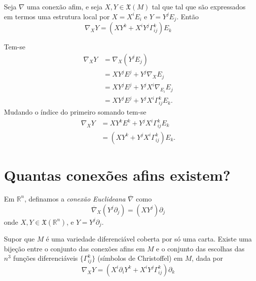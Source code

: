 \begin{lema}\label{conexiones lineales en función de símbolos de Chritoffel}
	Seja $\nabla$ uma conexão afim, e seja $X,Y \in \mathfrak{X}(M)$ tal que tal que são expressados em termos uma estrutura local por $X = X^i E_i$ e $Y = Y^j E_j$. Então
	\begin{equation*}
		\nabla_X Y = \left( X Y^k + X^i Y^j \Gamma^k_{ij} \right) E_k
	\end{equation*}
\end{lema}

\begin{demonstracao}
	Tem-se
	\begin{align*}
		\nabla_X Y &= \nabla_X (Y^j E_j)\\
		&= X Y^j E^j + Y^j \nabla_X E_j\\
		&= X Y^j E^j + Y^j X^i \nabla_{E_i} E_j\\
		&= X Y^j E^j + Y^j X^i \Gamma^k_{ij} E_k.
	\end{align*}
	Mudando o índice do primeiro somando tem-se
	\begin{align*}
		\nabla_X Y &= X Y^k E^k + Y^j X^i \Gamma^k_{ij} E_k\\
		&= (X Y^k + Y^j X^i \Gamma^k_{ij}) E_k.
	\end{align*}
\end{demonstracao}

\section{Quantas conexões afins existem?}

\begin{definicao}
	Em $\mathbb{R}^n$, definamos a \emph{conexão Euclideana} $\overline{\nabla}$ como
	\begin{equation*}
		\overline{\nabla}_X \left( Y^j \partial_j \right) = (X Y^j) \partial_j
	\end{equation*}
	onde $X,Y \in \mathfrak{X}(\mathbb{R}^n)$, e $Y = Y^j \partial_j$.
\end{definicao}

\begin{lema}\label{bijecao-entre-a-escolha-dos-simbolos-de-christoffel-e-as-conexoes-lineares}
	Supor que $M$ é uma variedade diferenciável coberta por só uma carta. Existe uma bijeção entre o conjunto das conexões afins em $M$ e o conjunto das escolhas das $n^3$ funções diferenciáveis $\{ \Gamma^k_{ij} \}$ (símbolos de Christoffel) em $M$, dada por
	\begin{equation*}
		\nabla_X Y = \left( X^i \partial_i Y^k + X^i Y^j \Gamma^k_{ij} \right) \partial_k
	\end{equation*}
\end{lema}

